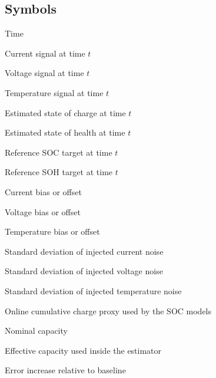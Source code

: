\documentclass[review,nopreprintline]{elsarticle}
\begin{document}
\subsection*{Symbols}
\begin{description}[style=multiline,leftmargin=1.7cm,font=\bfseries]
\item[$t$] Time
\item[$I(t)$] Current signal at time $t$
\item[$U(t)$] Voltage signal at time $t$
\item[$T(t)$] Temperature signal at time $t$
\item[$\widehat{\mathrm{SOC}}(t)$] Estimated state of charge at time $t$
\item[$\widehat{\mathrm{SOH}}(t)$] Estimated state of health at time $t$
\item[$\mathrm{SOC}_{\mathrm{ref}}(t)$] Reference SOC target at time $t$
\item[$\mathrm{SOH}_{\mathrm{ref}}(t)$] Reference SOH target at time $t$
\item[$\Delta I$] Current bias or offset
\item[$\Delta U$] Voltage bias or offset
\item[$\Delta T$] Temperature bias or offset
\item[$\sigma_I$] Standard deviation of injected current noise
\item[$\sigma_U$] Standard deviation of injected voltage noise
\item[$\sigma_T$] Standard deviation of injected temperature noise
\item[$Q_c$] Online cumulative charge proxy used by the SOC models
\item[$C_{\mathrm{nom}}$] Nominal capacity
\item[$C_{\mathrm{eff}}$] Effective capacity used inside the estimator
\item[$\Delta\mathrm{MAE}$] Error increase relative to baseline
\end{description}
\normalsize
\end{document}
